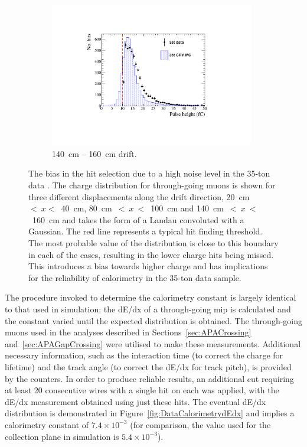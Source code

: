 \begin{figure}
\begin{subfigure}[t]{0.32\linewidth}
    \includegraphics[width=0.98\textwidth]{HitReconstructionBias140-160.pdf}
    \caption{140~cm -- 160~cm drift.}
    \label{fig:DataCalorimetryThreshold3}
  \end{subfigure}
  \caption[The bias in the hit selection due to a high noise level in the 35-ton data.]{The bias in the hit selection due to a high noise level in the 35-ton data \cite{Brailsford2016}.  The charge distribution for through-going muons is shown for three different displacements along the drift direction, 20~cm~$<~x<$~40~cm, 80~cm~$<~x~<$~100~cm and 140~cm~$<~x~<$~160~cm and takes the form of a Landau convoluted with a Gaussian.  The red line represents a typical hit finding threshold.  The most probable value of the distribution is close to this boundary in each of the cases, resulting in the lower charge hits being missed.  This introduces a bias towards higher charge and has implications for the reliability of calorimetry in the 35-ton data sample.}
  \label{fig:DataCalorimetryThreshold}
\end{figure}

The procedure invoked to determine the calorimetry constant is largely identical to that used in simulation: the dE/dx of a through-going mip is calculated and the constant varied until the expected distribution is obtained.  The through-going muons used in the analyses described in Sections~\ref{sec:APACrossing} and~\ref{sec:APAGapCrossing} were utilised to make these measurements.  Additional necessary information, such as the interaction time (to correct the charge for lifetime) and the track angle (to correct the dE/dx for track pitch), is provided by the counters.  In order to produce reliable results, an additional cut requiring at least 20 consecutive wires with a single hit on each was applied, with the dE/dx measurement obtained using just these hits.  The eventual dE/dx distribution is demonstrated in Figure~\ref{fig:DataCalorimetrydEdx} and implies a calorimetry constant of $7.4\times10^{-3}$ (for comparison, the value used for the collection plane in simulation is $5.4\times10^{-3}$).

